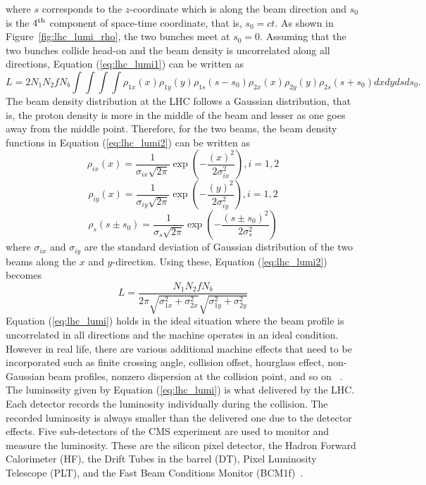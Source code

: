 \begin{itemize}[leftmargin=*]
\begin{equation}
	\end{equation}
	where $s$ corresponds to the $z$-coordinate which is along the beam direction and $s_0$ is
	the $4^{\rm{th}}$ component of space-time coordinate, that is, $s_0 = ct$. As shown in 
	Figure~\ref{fig:lhc_lumi_rho}, the two bunches meet at $s_0 = 0$. Assuming that the two
	bunches collide head-on and the beam density is uncorrelated along all directions, 
	Equation (\ref{eq:lhc_lumi1}) can be written as
	\begin{equation}
		L =  2N_1N_2fN_b\int\int\int\int \rho_{1x}(x)\rho_{1y}(y)
		\rho_{1s}(s-s_0)\rho_{2x}(x)\rho_{2y}(y)\rho_{2s}(s+s_0) dxdydsds_0.
	\label{eq:lhc_lumi2}
	\end{equation}
 	The beam density distribution at the LHC follows a Gaussian distribution, that is, the 
	proton density is more in the middle of the beam and lesser as one goes away from the
	middle point. Therefore, for the two beams, the beam density functions in 
	Equation (\ref{eq:lhc_lumi2}) can be written as
	\begin{equation}
		\rho_{ix}(x) = \frac{1}{\sigma_{ix}\sqrt{2\pi}}
		\exp\left(-\frac{(x)^2}{2\sigma_{ix}^2}\right), i = 1, 2
	\end{equation}
	\begin{equation}
		\rho_{iy}(x) = \frac{1}{\sigma_{iy}\sqrt{2\pi}}
		\exp\left(-\frac{(y)^2}{2\sigma_{iy}^2}\right), i =1, 2
	\end{equation}
	\begin{equation}
		\rho_s(s\pm s_0) = \frac{1}{\sigma_s\sqrt{2\pi}}
		\exp\left(-\frac{(s\pm s_0)^2}{2\sigma_s^2}\right)
	\end{equation}
	where $\sigma_{ix}$ and $\sigma_{iy}$ are the standard deviation of Gaussian distribution 
	of the two beams along the $x$ and $y$-direction. Using these, Equation (\ref{eq:lhc_lumi2}) 
	becomes \cite{Herr:941318}
	\begin{equation}
		L = \frac{N_1N_2fN_b}{2\pi\sqrt{\sigma_{1x}^2 + \sigma_{2x}^2}
		\sqrt{\sigma_{1y}^2 + \sigma_{2y}^2}}
	\label{eq:lhc_lumi}
	\end{equation}
        Equation (\ref{eq:lhc_lumi}) holds in the ideal situation where the beam profile 
	is uncorrelated in all directions and the machine operates in an ideal condition. However 
	in real life, there are various additional machine effects that need to be 
	incorporated such as finite crossing angle, collision offset, hourglass effect, non-Gaussian 
	beam profiles, nonzero dispersion at the collision point, and so on ~\cite{Herr:941318}. 
	The luminosity given by Equation (\ref{eq:lhc_lumi}) is what delivered by the LHC. Each 
	detector records the luminosity individually during the collision. The recorded luminosity 
	is always smaller than the delivered one due to the detector effects. Five sub-detectors of 
	the CMS experiment are used to monitor and measure the luminosity. These are the silicon 
	pixel detector, the Hadron Forward Calorimeter (HF), the Drift Tubes in the barrel (DT), 
	Pixel Luminosity Telescope (PLT), and  the Fast Beam Conditions Monitor 
	(BCM1f)~\cite{CMS-PAS-LUM-15-001}.


\end{itemize}
